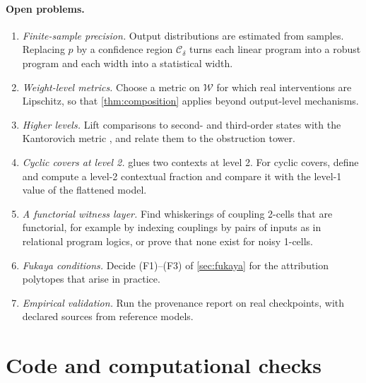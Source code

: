 \documentclass[11pt]{article}
\theoremstyle{definition}
\theoremstyle{remark}
\newcommand{\cW}{\mathcal{W}}
\begin{document}
\paragraph{Open problems.}
\begin{enumerate}[leftmargin=*]
\item \emph{Finite-sample precision.} Output distributions are estimated from samples. Replacing $p$ by
  a confidence region $\mathcal C_\delta$ turns each linear program into a robust program and each width
  into a statistical width.
\item \emph{Weight-level metrics.} Choose a metric on $\cW$ for which real interventions are Lipschitz,
  so that \cref{thm:composition} applies beyond output-level mechanisms.
\item \emph{Higher levels.} Lift comparisons to second- and third-order states with the Kantorovich
  metric \cite{FritzPerrone2019}, and relate them to the obstruction tower.
\item \emph{Cyclic covers at level 2.}  glues two contexts at level 2. For cyclic
  covers, define and compute a level-2 contextual fraction and compare it with the level-1 value of
  the flattened model.
\item \emph{A functorial witness layer.} Find whiskerings of coupling 2-cells that are functorial, for
  example by indexing couplings by pairs of inputs as in relational program logics, or prove that none
  exist for noisy 1-cells.
\item \emph{Fukaya conditions.} Decide (F1)--(F3) of \cref{sec:fukaya} for the attribution polytopes
  that arise in practice.
\item \emph{Empirical validation.} Run the provenance report on real checkpoints, with declared sources
  from reference models.
\end{enumerate}

\appendix

\section{Code and computational checks}\label{sec:code}
\end{document}
